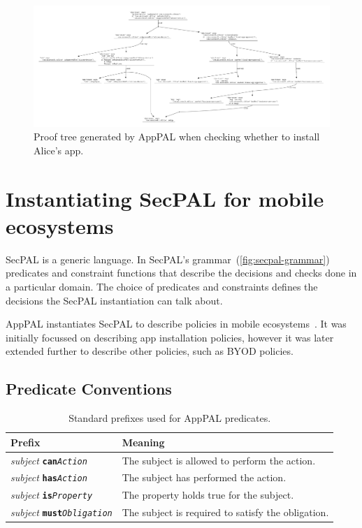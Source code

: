 \documentclass[thesis.tex]{subfiles}
\begin{document}
\begin{figure}
  \centering
  \includegraphics[width=1.0\textheight, angle=90]{figures/exemplar-proof.pdf}
  \caption[Proof tree output by AppPAL]{Proof tree generated by AppPAL when checking whether to install Alice's app.}
  \label{fig:exemplar-proof}
\end{figure}



\section{Instantiating SecPAL for mobile ecosystems}
\label{sec:instantiating}

SecPAL is a generic language.
In SecPAL's grammar~(\autoref{fig:secpal-grammar}) predicates and constraint functions that describe the decisions and checks done in a particular domain.
The choice of predicates and constraints defines the decisions the SecPAL instantiation can talk about.

AppPAL instantiates SecPAL to describe policies in mobile ecosystems~\cite{hallett_apppal_2016}.
It was initially focussed on describing app installation policies, however it was later extended further to describe other policies, such as \ac{BYOD} policies.

\subsection{Predicate Conventions}
\label{ssec:types}

\newcommand{\descPred}[2]{\emph{subject} \texttt{\textbf{#1}\emph{#2}}}
\begin{table}
  \begin{tabular}{l l}
    \toprule
    Prefix                      & Meaning                                            \\
    \midrule
    \descPred{can}{Action}      & The subject is allowed to perform the action.      \\
    \descPred{has}{Action}      & The subject has performed the action.              \\
    \descPred{is}{Property}     & The property holds true for the subject.           \\
    \descPred{must}{Obligation} & The subject is required to satisfy the obligation. \\
    \bottomrule
  \end{tabular}
  \caption{Standard prefixes used for AppPAL predicates.}
  \label{tab:predicate-prefixes}
\end{table}
\end{document}
